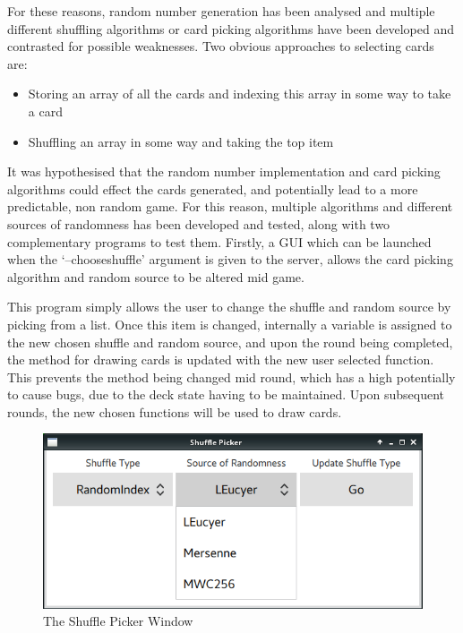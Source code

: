 For these reasons, random number generation has been analysed and multiple
different shuffling algorithms or card picking algorithms have been
developed and contrasted for possible weaknesses. Two obvious approaches to 
selecting cards are:

\begin{itemize}
    \item Storing an array of all the cards and indexing this array in some way to take a card
    \item Shuffling an array in some way and taking the top item
\end{itemize}

It was hypothesised that the random number implementation and card picking
algorithms could effect the cards generated, and potentially lead to a more
predictable, non random game. For this reason, multiple algorithms and
different sources of randomness has been developed and tested, along with two
complementary programs to test them. Firstly, a GUI which can be launched
when the `--chooseshuffle' argument is given to the server, allows the card
picking algorithm and random source to be altered mid game.

This program simply allows the user to change the shuffle and random source
by picking from a list. Once this item is changed, internally a variable is
assigned to the new chosen shuffle and random source, and upon the round
being completed, the method for drawing cards is updated with the new user
selected function. This prevents the method being changed mid round, which
has a high potentially to cause bugs, due to the deck state having to be
maintained. Upon subsequent rounds, the new chosen functions will be used
to draw cards.

\begin{figure}[H]
    \centering
    \includegraphics[width=0.8\linewidth]{../images/shufflepicker.png}
    \caption{The Shuffle Picker Window}%
    \label{fig:shufflepicker}
\end{figure}

